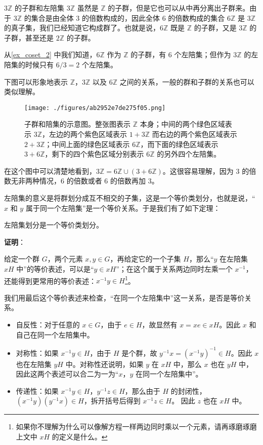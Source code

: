 \begin{example}{$3\mathbb{Z}$ 的子群和左陪集}\label{ex_coset_3}
$3\mathbb{Z}$ 虽然是 $\mathbb{Z}$ 的子群，但是它也可以从中再分离出子群来。由于 $3\mathbb{Z}$ 的集合是由全体 $3$ 的倍数构成的，因此全体 $6$ 的倍数构成的集合 $6\mathbb{Z}$ 是 $3\mathbb{Z}$ 的真子集，我们已经知道它构成群了。也就是说，$6\mathbb{Z}$ 既是 $\mathbb{Z}$ 的子群，又是 $3\mathbb{Z}$ 的子群，甚至还是 $2\mathbb{Z}$ 的子群。

从\autoref{ex_coset_2} 中我们知道，$6\mathbb{Z}$ 作为 $\mathbb{Z}$ 的子群，有 $6$ 个左陪集；但作为 $3\mathbb{Z}$ 的左陪集的时候只有 $6/3=2$ 个左陪集。

下图可以形象地表示 $\mathbb{Z}$，$3\mathbb{Z}$ 以及 $6\mathbb{Z}$ 之间的关系，一般的群和子群的关系也可以类似理解。

\begin{figure}[ht]
\centering
\texttt{[image: ./figures/ab2952e7de275f05.png]}
\caption{子群和陪集的示意图。整张图表示 $\mathbb{Z}$ 本身；中间的两个绿色区域表示 $3\mathbb{Z}$，左边的两个紫色区域表示 $1+3\mathbb{Z}$ 而右边的两个紫色区域表示 $2+3\mathbb{Z}$；中间上面的绿色区域表示 $6\mathbb{Z}$，而下面的绿色区域表示 $3+6\mathbb{Z}$，剩下的四个紫色区域分别表示 $6\mathbb{Z}$ 的另外四个左陪集。} \label{fig_coset_1}
\end{figure}

在这个图中可以清楚地看到，$3\mathbb{Z}=6\mathbb{Z}\cup(3+6\mathbb{Z})$。这很容易理解，因为 $3$ 的倍数无非两种情况，$6$ 的倍数或者 $6$ 的倍数再加 $3$。

\end{example}

左陪集的意义是将群划分成互不相交的子集，这是一个等价类划分，也就是说，“$x$ 和 $y$ 属于同一个左陪集”是一个等价关系。于是我们有了如下定理： 

\begin{theorem}{}\label{the_coset_1}

左陪集划分是一个等价类划分。

\end{theorem}

\textbf{证明}：

给定一个群 $G$，两个元素 $x, y\in G$，再给定它的一个子集 $H$，那么“$y$ 在左陪集 $xH$ 中”的等价表述，可以是“$y\in xH$”；在这个属于关系两边同时左乘一个 $x^{-1}$，还能得到更常用的等价表述：$x^{-1}y\in H$\footnote{如果你不理解为什么可以像解方程一样两边同时乘以一个元素，请再琢磨琢磨上文中 $xH$ 的定义是什么。}。

我们用最后这个等价表述来检查，“在同一个左陪集中”这一关系，是否是等价关系。
\begin{itemize}
\item 自反性：对于任意的 $x\in G$，由于 $e\in H$，故显然有 $x=xe\in xH$。因此 $x$ 和自己在同一个左陪集中。
\item 对称性：如果 $x^{-1}y\in H$，由于 $H$ 是个群，故 $y^{-1}x=(x^{-1}y)^{-1}\in H$。因此 $x$ 也在左陪集 $yH$ 中。对称性还说明，如果 $y$ 在 $xH$ 中，那么 $x$ 也在 $yH$ 中，因此这两个表述可以合二为一为“$x$，$y$ 在同一个左陪集中”。
\item 传递性：如果 $x^{-1}y\in H$，$y^{-1}z\in H$，那么由于 $H$ 的封闭性，$(x^{-1}y)(y^{-1}x)\in H$，拆开括号后得到 $x^{-1}z\in H$。 因此 $z$ 也在 $xH$ 中。
\end{itemize}

